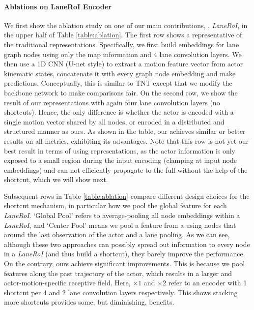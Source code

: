 \paragraph{Ablations on LaneRoI Encoder}
We first show the ablation study on one of our main contributions, \ie,
\textit{LaneRoI}, in the upper half of Table
\ref{table:ablation}. 
The first row shows a representative of the traditional representations. 
Specifically, we first build
embeddings for lane graph nodes using only the map information and 4 lane
convolution layers. We then use a
1D CNN (U-net style) to extract a motion feature vector from actor kinematic states, concatenate it
with every graph node embedding and make predictions. Conceptually, this is
similar to TNT \cite{tnt} except that we modify the backbone network to make comparisons fair. 
On the second row, we show the result of our \ROI
representations with again four lane convolution layers (no shortcuts). Hence, the only difference
is whether the actor is encoded with a single motion vector shared by
all nodes, or encoded in a distributed and structured manner as ours. As shown
in the table, our \ROI achieves similar or better results on all
metrics, exhibiting its advantages. Note that this row is not yet our best result
in terms of using \ROI representations, as the actor information is only exposed
to a small region during the input encoding (clamping at input
node embeddings) and can not efficiently propagate to
the full \ROI without the help of the shortcut, which we will show next.

Subsequent rows in Table \ref{table:ablation} compare different design
choices for the shortcut mechanism, in particular how we pool the global feature
for each \textit{LaneRoI}. `Global Pool' refers to average-pooling all node
embeddings within a \textit{LaneRoI}, and `Center Pool' means we pool a feature
from a \ROI using nodes that around the last observation of the actor and a lane
pooling. As we can see, although these two approaches can possibly
spread out information to every node in a \textit{LaneRoI} (and thus build a
shortcut), they barely improve the performance. 
On the contrary, ours achieve
significant improvements. This is because we pool features along the past
trajectory of the actor, which results in a larger and actor-motion-specific receptive field.
Here, $\times 1$ and $\times 2$ refer to an encoder with 1 shortcut per 4 and 2 lane
convolution layers respectively. This shows stacking more shortcuts
provides some, but diminishing, benefits.









